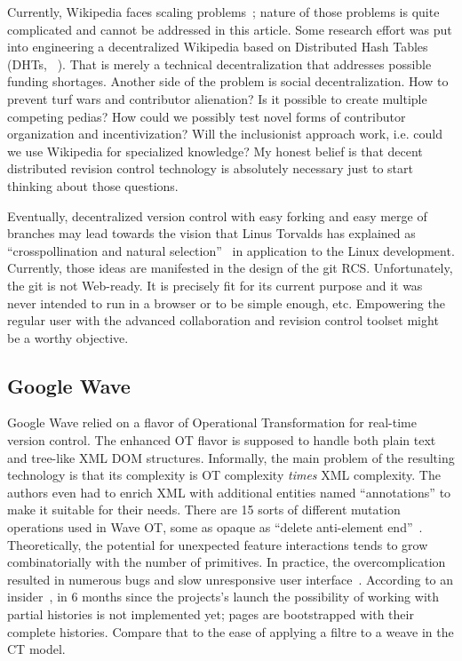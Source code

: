 \documentclass{sig-alternate}
\begin{document}
Currently, Wikipedia faces scaling problems~\cite{wp-decay,no-singularity}; nature of those problems is quite complicated and cannot be addressed in this article.
Some research effort was put into engineering a decentralized Wikipedia based on Distributed Hash Tables (DHTs, ~\cite{urdaneta}).
That is merely a technical decentralization that addresses possible funding shortages.
Another side of the problem is social decentralization.
How to prevent turf wars and contributor alienation?
Is it possible to create multiple competing pedias?
How could we possibly test novel forms of contributor organization and incentivization?
Will the inclusionist approach work, i.e. could we use Wikipedia for specialized knowledge?
My honest belief is that decent distributed revision control technology is absolutely necessary just to start thinking about those questions.

Eventually, decentralized version control with easy forking and easy merge of branches may lead towards the vision that Linus Torvalds has explained as ``crosspollination and natural selection''~\cite{linus-pollinates} in application to the Linux development.
Currently, those ideas are manifested in the design of the git RCS.
Unfortunately, the git is not Web-ready.
It is precisely fit for its current purpose and it was never intended to run in a browser or to be simple enough, etc.
Empowering the regular user with the advanced collaboration and revision control toolset might be a worthy objective.


\subsection{Google Wave}  \label{sec:waveot}

Google Wave relied on a flavor of Operational Transformation for
real-time version control. The enhanced OT flavor is supposed to
handle both plain text and tree-like XML DOM structures.
Informally, the main problem of the resulting technology is that
its complexity is OT complexity \emph{times} XML complexity. 
The authors even had to enrich XML with additional entities 
named ``annotations'' to make it suitable for their needs.
There are 15 sorts of different mutation operations used in Wave
OT, some as opaque as ``delete anti-element end''~\cite{waveot}.
Theoretically, the potential for unexpected feature interactions
tends to grow combinatorially with the number of primitives.
In practice, the overcomplication resulted in numerous bugs and
slow unresponsive user interface~\cite{own-experience}.
According to an insider~\cite{gerasimov}, in 6 months since the
projects's launch the possibility of working with partial
histories is not  implemented yet; pages are bootstrapped with
their complete histories. Compare that to the ease of applying
a filtre to a weave in the CT model.
\end{document}
